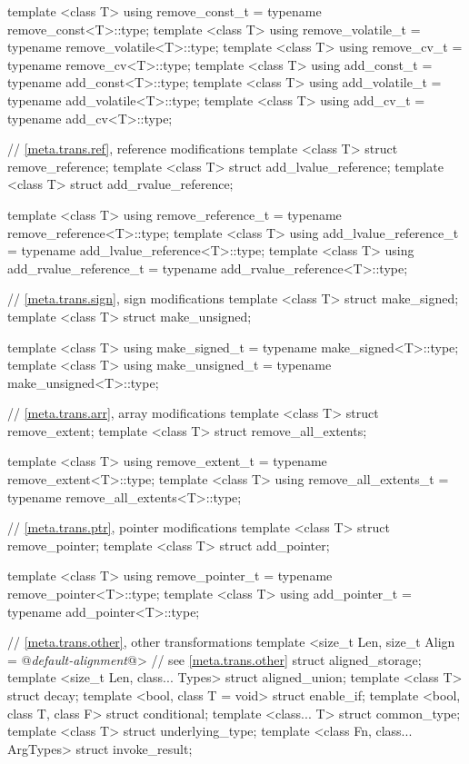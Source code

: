 \begin{codeblock}
{  template <class T>
    using remove_const_t    = typename remove_const<T>::type;
  template <class T>
    using remove_volatile_t = typename remove_volatile<T>::type;
  template <class T>
    using remove_cv_t       = typename remove_cv<T>::type;
  template <class T>
    using add_const_t       = typename add_const<T>::type;
  template <class T>
    using add_volatile_t    = typename add_volatile<T>::type;
  template <class T>
    using add_cv_t          = typename add_cv<T>::type;

  // \ref{meta.trans.ref}, reference modifications
  template <class T> struct remove_reference;
  template <class T> struct add_lvalue_reference;
  template <class T> struct add_rvalue_reference;

  template <class T>
    using remove_reference_t     = typename remove_reference<T>::type;
  template <class T>
    using add_lvalue_reference_t = typename add_lvalue_reference<T>::type;
  template <class T>
    using add_rvalue_reference_t = typename add_rvalue_reference<T>::type;

  // \ref{meta.trans.sign}, sign modifications
  template <class T> struct make_signed;
  template <class T> struct make_unsigned;

  template <class T>
    using make_signed_t   = typename make_signed<T>::type;
  template <class T>
    using make_unsigned_t = typename make_unsigned<T>::type;

  // \ref{meta.trans.arr}, array modifications
  template <class T> struct remove_extent;
  template <class T> struct remove_all_extents;

  template <class T>
    using remove_extent_t      = typename remove_extent<T>::type;
  template <class T>
    using remove_all_extents_t = typename remove_all_extents<T>::type;

  // \ref{meta.trans.ptr}, pointer modifications
  template <class T> struct remove_pointer;
  template <class T> struct add_pointer;

  template <class T>
    using remove_pointer_t = typename remove_pointer<T>::type;
  template <class T>
    using add_pointer_t    = typename add_pointer<T>::type;

  // \ref{meta.trans.other}, other transformations
  template <size_t Len,
            size_t Align = @\textit{default-alignment}@> // see \ref{meta.trans.other}
    struct aligned_storage;
  template <size_t Len, class... Types> struct aligned_union;
  template <class T> struct decay;
  template <bool, class T = void> struct enable_if;
  template <bool, class T, class F> struct conditional;
  template <class... T> struct common_type;
  template <class T> struct underlying_type;
  template <class Fn, class... ArgTypes> struct invoke_result;

}
\end{codeblock}
